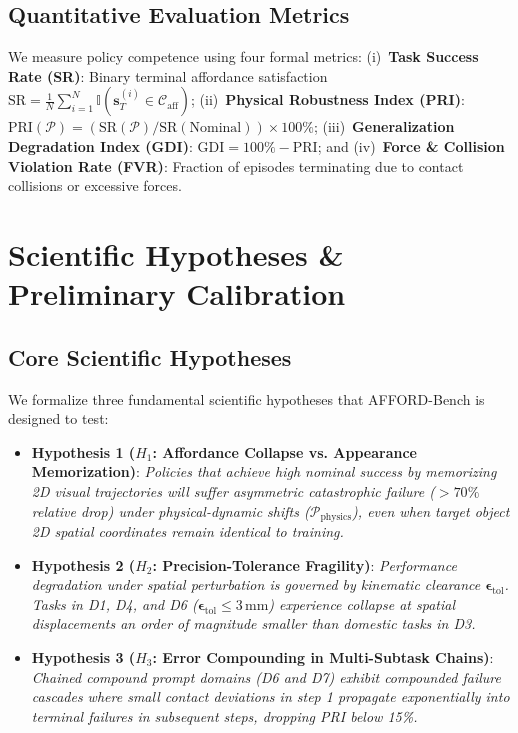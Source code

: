 \documentclass[conference]{IEEEtran}
\begin{document}
\subsection{Quantitative Evaluation Metrics}
We measure policy competence using four formal metrics: (i)~\textbf{Task Success Rate (SR)}: Binary terminal affordance satisfaction $\text{SR} = \frac{1}{N} \sum_{i=1}^N \mathbb{I}(\mathbf{s}_T^{(i)} \in \mathcal{C}_{\text{aff}})$; (ii)~\textbf{Physical Robustness Index (PRI)}: $\text{PRI}(\mathcal{P}) = (\text{SR}(\mathcal{P}) / \text{SR}(\text{Nominal})) \times 100\%$; (iii)~\textbf{Generalization Degradation Index (GDI)}: $\text{GDI} = 100\% - \text{PRI}$; and (iv)~\textbf{Force \& Collision Violation Rate (FVR)}: Fraction of episodes terminating due to contact collisions or excessive forces.

\section{Scientific Hypotheses \& Preliminary Calibration}
\label{sec:hypotheses}

\subsection{Core Scientific Hypotheses}
We formalize three fundamental scientific hypotheses that AFFORD-Bench is designed to test:
\begin{itemize}
    \item \textbf{Hypothesis 1 ($H_1$: Affordance Collapse vs. Appearance Memorization)}: \textit{Policies that achieve high nominal success by memorizing 2D visual trajectories will suffer asymmetric catastrophic failure ($>70\%$ relative drop) under physical-dynamic shifts ($\mathcal{P}_{\mathrm{physics}}$), even when target object 2D spatial coordinates remain identical to training.}
    \item \textbf{Hypothesis 2 ($H_2$: Precision-Tolerance Fragility)}: \textit{Performance degradation under spatial perturbation is governed by kinematic clearance $\boldsymbol{\epsilon}_{\text{tol}}$. Tasks in D1, D4, and D6 ($\boldsymbol{\epsilon}_{\text{tol}} \le 3\,\text{mm}$) experience collapse at spatial displacements an order of magnitude smaller than domestic tasks in D3.}
    \item \textbf{Hypothesis 3 ($H_3$: Error Compounding in Multi-Subtask Chains)}: \textit{Chained compound prompt domains (D6 and D7) exhibit compounded failure cascades where small contact deviations in step 1 propagate exponentially into terminal failures in subsequent steps, dropping PRI below 15\%.}
\end{itemize}
\end{document}
